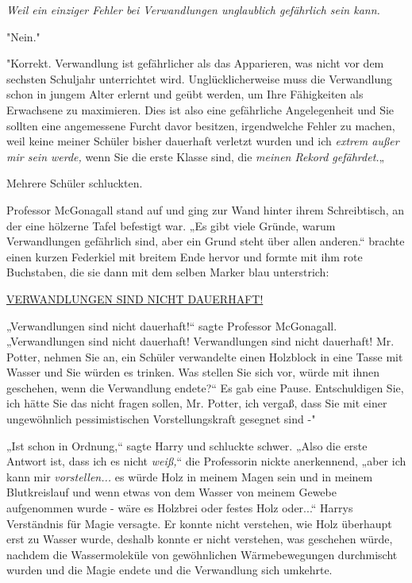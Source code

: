 {\emph{Weil ein einziger Fehler bei Verwandlungen unglaublich gefährlich sein kann.}

"Nein."

"Korrekt. Verwandlung ist gefährlicher als das Apparieren, was nicht vor dem sechsten Schuljahr unterrichtet wird. Unglücklicherweise muss die Verwandlung schon in jungem Alter erlernt und geübt werden, um Ihre Fähigkeiten als Erwachsene zu maximieren. Dies ist also eine gefährliche Angelegenheit und Sie sollten eine angemessene Furcht davor besitzen, irgendwelche Fehler zu machen, weil keine meiner Schüler bisher dauerhaft verletzt wurden und ich \emph{extrem außer mir sein werde,} wenn Sie die erste Klasse sind, die \emph{meinen Rekord gefährdet.}„

Mehrere Schüler schluckten.

Professor McGonagall stand auf und ging zur Wand hinter ihrem Schreibtisch, an der eine hölzerne Tafel befestigt war. „Es gibt viele Gründe, warum Verwandlungen gefährlich sind, aber ein Grund steht über allen anderen.“ brachte einen kurzen Federkiel mit breitem Ende hervor und formte mit ihm rote Buchstaben, die sie dann mit dem selben Marker blau unterstrich:

\uline{VERWANDLUNGEN SIND NICHT DAUERHAFT!}

„Verwandlungen sind nicht dauerhaft!“ sagte Professor McGonagall. „Verwandlungen sind nicht dauerhaft! Verwandlungen sind nicht dauerhaft! Mr. Potter, nehmen Sie an, ein Schüler verwandelte einen Holzblock in eine Tasse mit Wasser und Sie würden es trinken. Was stellen Sie sich vor, würde mit ihnen geschehen, wenn die Verwandlung endete?“ Es gab eine Pause. Entschuldigen Sie, ich hätte Sie das nicht fragen sollen, Mr. Potter, ich vergaß, dass Sie mit einer ungewöhnlich pessimistischen Vorstellungskraft gesegnet sind -"

„Ist schon in Ordnung,“ sagte Harry und schluckte schwer. „Also die erste Antwort ist, dass ich es nicht \emph{weiß,}“ die Professorin nickte anerkennend, „aber ich kann mir \emph{vorstellen...} es würde Holz in meinem Magen sein und in meinem Blutkreislauf und wenn etwas von dem Wasser von meinem Gewebe aufgenommen wurde - wäre es Holzbrei oder festes Holz oder...“ Harrys Verständnis für Magie versagte. Er konnte nicht verstehen, wie Holz überhaupt erst zu Wasser wurde, deshalb konnte er nicht verstehen, was geschehen würde, nachdem die Wassermoleküle von gewöhnlichen Wärmebewegungen durchmischt wurden und die Magie endete und die Verwandlung sich umkehrte.

}
